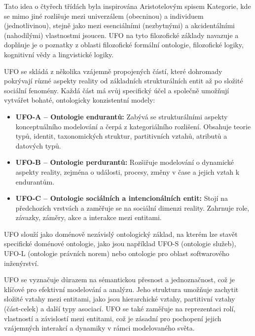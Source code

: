 Tato idea o čtyřech třídách byla inspirována Aristotelovým spisem Kategorie, kde se mimo jiné rozlišuje mezi  univerzálem (obecninou) a individuem (jednotlivinou), stejně jako mezi esenciálními (nezbytnými) a akcidentálními (nahodilými) vlastnostmi jsoucen. UFO na tyto filozofické základy navazuje a doplňuje je o poznatky z oblasti filozofické formální ontologie, filozofické logiky, kognitivní vědy a lingvistické logiky. \cite{Vancura2009}

UFO se skládá z několika vzájemně propojených částí, které dohromady pokrývají různé aspekty reality od základních strukturálních entit až po složité sociální fenomény. Každá část má svůj specifický účel a společně umožňují vytvářet bohaté, ontologicky konzistentní modely:

\begin{itemize}
  \item \textbf{UFO-A – Ontologie endurantů:} Zabývá se strukturálními aspekty konceptuálního modelování a čerpá z kategoriálního rozlišení. Obsahuje teorie typů, identit, taxonomických struktur, partitivních vztahů, atributů a datových typů.
  \item \textbf{UFO-B – Ontologie perdurantů:} Rozšiřuje modelování o dynamické aspekty reality, zejména o události, procesy, změny v čase a jejich vztah k endurantům.
  \item \textbf{UFO-C – Ontologie sociálních a intencionálních entit:} Stojí na předchozích vrstvách a zaměřuje se na sociální dimenzi reality. Zahrnuje role, závazky, záměry, akce a interakce mezi entitami. \cite{Pergl2018, Guizzardi2015,Guizzardi2022}
\end{itemize}
UFO slouží jako doménově nezávislý ontologický základ, na kterém lze stavět specifické doménové ontologie, jako jsou například UFO-S (ontologie služeb), UFO-L (ontologie právních norem) nebo ontologie pro oblast softwarového inženýrství. \cite{Pergl2018}

UFO se vyznačuje důrazem na sémantickou přesnost a jednoznačnost, což je klíčové pro efektivní modelování a analýzu. Jeho struktura umožňuje zachytit složité vztahy mezi entitami, jako jsou hierarchické vztahy, partitivní vztahy (část-celek) a další typy asociací. UFO se také zaměřuje na reprezentaci rolí, vlastností a závislostí mezi entitami, což je zásadní pro pochopení jejich vzájemných interakcí a dynamiky v rámci modelovaného světa. \cite{Guizzardi2015}


